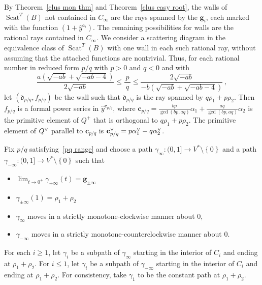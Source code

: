 \documentclass[10pt,a4paper]{amsart}
\theoremstyle{definition}
\DeclareMathOperator{\Scat}{Scat}
\newcommand{\set}[1]{{\left\lbrace #1 \right\rbrace}}
\newcommand{\ck}{\spcheck}
\newcommand{\g}{\mathbf{g}}
\newcommand{\cc}{\mathbf{c}}
\renewcommand{\d}{{\mathfrak d}}
\newcommand{\hy}{\hat{y}}
\begin{document}
By Theorem~\ref{clus mon thm} and Theorem~\ref{clus easy root}, the walls of $\Scat^T(B)$ not contained in $C_\infty$ are the rays spanned by the $\g_i$, each marked with the function $(1+\hy^{\cc_i})$.
The remaining possibilities for walls are the rational rays contained in $C_\infty$.
We consider a scattering diagram in the equivalence class of $\Scat^T(B)$ with one wall in each such rational ray, without assuming that the attached functions are nontrivial.
Thus, for each rational number in reduced form $p/q$ with $p>0$ and $q<0$ and with 
\begin{equation}\label{pq range}
\frac{a(\sqrt{-ab}+\sqrt{-ab-4})}{2\sqrt{-ab}}\le\frac{\,p\,}q\le\frac{2\sqrt{-ab}}{-b(\sqrt{-ab}+\sqrt{-ab-4})}\,,
\end{equation}
let $(\d_{p/q},f_{p/q})$ be the wall such that $\d_{p/q}$ is the ray spanned by $q\rho_1+p\rho_2$.
Then $f_{p/q}$ is a formal power series in $\hy^{\cc_{p/q}}$, where $\cc_{p/q}=\frac{bp}{\gcd(bp,aq)}\alpha_1+\frac{aq}{\gcd(bp,aq)}\alpha_2$ is the primitive element of $Q^+$ that is orthogonal to $q\rho_1+p\rho_2$.
The primitive element of $Q\ck$ parallel to $\cc_{p/q}$ is $\cc\ck_{p/q}=p\alpha\ck_1-q\alpha\ck_2$.

Fix $p/q$ satisfying~\eqref{pq range} and choose a path $\gamma_\infty:(0,1]\to V^*\setminus\set{0}$ and a path ${\gamma_{-\infty}:(0,1]\to V^*\setminus\set{0}}$ such that
\begin{itemize} 
\item $\lim_{t\to0^+}\gamma_{\pm\infty}(t)=\g_{\pm\infty}$
\item $\gamma_{\pm\infty}(1)=\rho_1+\rho_2$
\item $\gamma_\infty$ moves in a strictly monotone-clockwise manner about $0$,
\item $\gamma_{-\infty}$ moves in a strictly monotone-counterclockwise manner about $0$.
\end{itemize}
For each $i\ge1$, let $\gamma_i$ be a subpath of $\gamma_{\infty}$ starting in the interior of $C_i$ and ending at $\rho_1+\rho_2$.
For $i\le1$, let $\gamma_i$ be a subpath of $\gamma_{-\infty}$ starting in the interior of $C_i$ and ending at $\rho_1+\rho_2$.
For consistency, take $\gamma_1$ to be the constant path at $\rho_1+\rho_2$.
\end{document}
